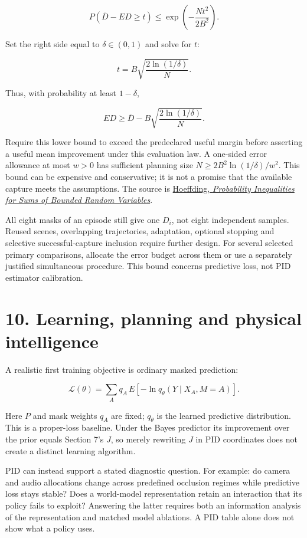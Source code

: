 \documentclass[11pt,a4paper]{article}
\begin{document}
\[
P\!\left(\overline D-E D\geq t\right)
\leq\exp\!\left(-\frac{Nt^2}{2B^2}\right).
\]

Set the right side equal to \(\delta\in(0,1)\) and solve for \(t\):

\[
t=B\sqrt{\frac{2\ln(1/\delta)}{N}}.
\]

Thus, with probability at least \(1-\delta\),

\[
E D\geq\overline D-B\sqrt{\frac{2\ln(1/\delta)}{N}}.
\]

Require this lower bound to exceed the predeclared useful margin before asserting a useful mean improvement under this evaluation law. A one-sided error allowance at most \(w>0\) has sufficient planning size \(N\geq2B^2\ln(1/\delta)/w^2\). This bound can be expensive and conservative; it is not a promise that the available capture meets the assumptions. The source is \href{https://doi.org/10.1080/01621459.1963.10500830}{Hoeffding, \emph{Probability Inequalities for Sums of Bounded Random Variables}}.

All eight masks of an episode still give one \(D_i\), not eight independent samples. Reused scenes, overlapping trajectories, adaptation, optional stopping and selective successful-capture inclusion require further design. For several selected primary comparisons, allocate the error budget across them or use a separately justified simultaneous procedure. This bound concerns predictive loss, not PID estimator calibration.

\par{}

\section{10. Learning, planning and physical intelligence}\label{learning-planning-and-physical-intelligence}

A realistic first training objective is ordinary masked prediction:

\[
\mathcal L(\theta)=\sum_Aq_A\,
E[-\ln q_\theta(Y\mid X_A,M=A)].
\]

Here \(P\) and mask weights \(q_A\) are fixed; \(q_\theta\) is the learned predictive distribution. This is a proper-loss baseline. Under the Bayes predictor its improvement over the prior equals Section 7's \(J\), so merely rewriting \(J\) in PID coordinates does not create a distinct learning algorithm.

PID can instead support a stated diagnostic question. For example: do camera and audio allocations change across predefined occlusion regimes while predictive loss stays stable? Does a world-model representation retain an interaction that its policy fails to exploit? Answering the latter requires both an information analysis of the representation and matched model ablations. A PID table alone does not show what a policy uses.
\end{document}
